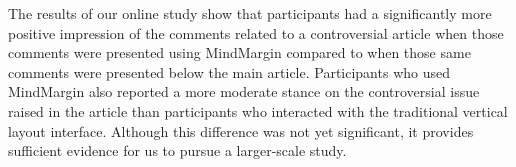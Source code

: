 The results of our online study show that participants had a significantly more positive impression of the comments related to a controversial article when those comments were presented using MindMargin compared to when those same comments were presented below the main article.  Participants who used MindMargin also reported a more moderate stance on the controversial issue raised in the article than participants who interacted with the traditional vertical layout interface.  Although this difference was not yet significant, it provides sufficient evidence for us to pursue a larger-scale study.



